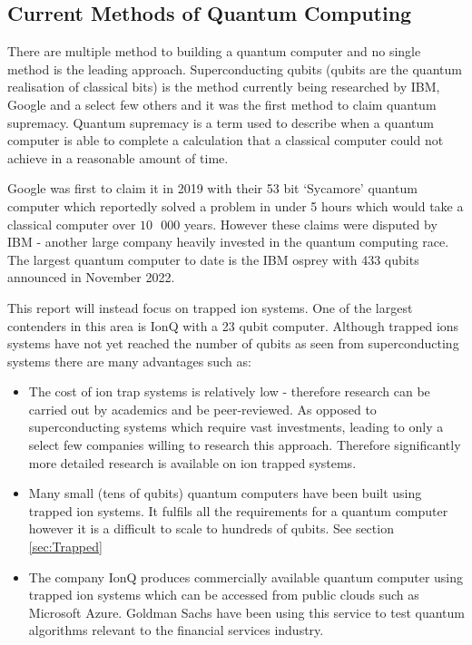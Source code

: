 \subsection{Current Methods of Quantum Computing}
There are multiple method to building a quantum computer and no single method is the leading approach.
Superconducting qubits (qubits are the quantum realisation of classical bits) is the method currently being researched by IBM, Google and a select few others and it was the first method to claim quantum supremacy. \cite{gibney_hello_2019}
Quantum supremacy is a term used to describe when a quantum computer is able to complete a calculation that a classical computer could not achieve in a reasonable amount of time. 

Google was first to claim it in 2019 with their 53 bit `Sycamore' quantum computer which reportedly solved a problem in under 5 hours which would take a classical computer over $10\text{ }000$ years.\cite{gibney_hello_2019} 
However these claims were disputed by IBM - another large company heavily invested in the quantum computing race.
The largest quantum computer to date is the IBM osprey with 433 qubits announced in November 2022.\cite{irving_ibm_2022}

This report will instead focus on trapped ion systems. 
One of the largest contenders in this area is IonQ with a 23 qubit computer. 
 Although trapped ions systems have not yet reached the number of qubits as seen from superconducting systems there are many advantages such as: 
\begin{itemize}
    \item The cost of ion trap systems is relatively low - therefore research can be carried out by academics and be peer-reviewed. As opposed to superconducting systems which require vast investments, leading to only a select few companies willing to research this approach. Therefore significantly more detailed research is available on ion trapped systems.  
    \item Many small (tens of qubits) quantum computers have been built using trapped ion systems. It fulfils all the requirements for a quantum computer however it is a difficult to scale to hundreds of qubits. See section \ref{sec:Trapped}
    \item The company IonQ produces commercially available quantum computer using trapped ion systems which can be accessed from public clouds such as Microsoft Azure. \cite{sonialopezbravo_ionq_nodate} Goldman Sachs have been using this service to test quantum algorithms relevant to the financial services industry. \cite{noauthor_goldman_2021}
\end{itemize}





